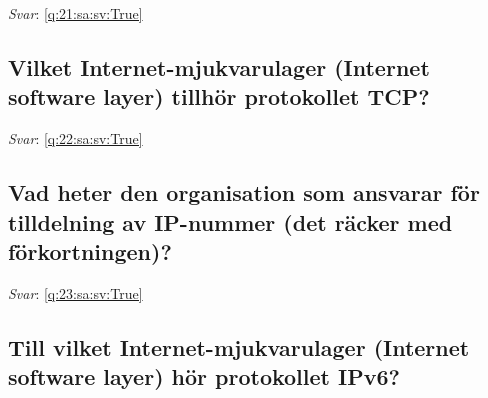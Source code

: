 \documentclass[a4paper,11pt,oneside]{article}
\begin{document}
\begin{sloppypar}
\label{q:21:sa:sv:False}

\vspace{2cm}

\noindent\makebox[\textwidth]{\hrulefill}

\vspace{1cm}

\textit{Svar}: \autoref{q:21:sa:sv:True}



\subsection{Vilket Internet-mjukvarulager (Internet software layer) tillh\"or protokollet TCP?}

\label{q:22:sa:sv:False}

\vspace{2cm}

\noindent\makebox[\textwidth]{\hrulefill}

\vspace{1cm}

\textit{Svar}: \autoref{q:22:sa:sv:True}



\subsection{Vad heter den organisation som ansvarar f\"or tilldelning av IP-nummer (det r\"acker med f\"orkortningen)?}

\label{q:23:sa:sv:False}

\vspace{2cm}

\noindent\makebox[\textwidth]{\hrulefill}

\vspace{1cm}

\textit{Svar}: \autoref{q:23:sa:sv:True}



\subsection{Till vilket Internet-mjukvarulager (Internet software layer) h\"or protokollet IPv6?}

\label{q:24:sa:sv:False}

\vspace{2cm}

\noindent\makebox[\textwidth]{\hrulefill}

\vspace{1cm}


\end{sloppypar}
\end{document}
